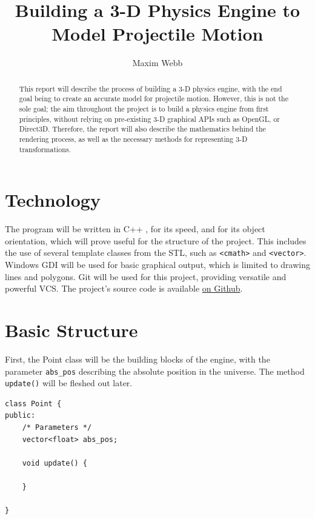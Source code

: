 \documentclass{article}
\title{
	\Huge
	{Building a 3-D Physics Engine to Model Projectile Motion}\\
}
\author{Maxim Webb}
\begin{document}
\maketitle

\newpage

\begin{abstract}
This report will describe the process of building a 3-D physics engine, with the end goal being to create an accurate model for projectile motion.
\newline
\newline
However, this is not the sole goal; the aim throughout the project is to build a physics engine from first principles, without relying on pre-existing 3-D graphical APIs such as OpenGL, or Direct3D. Therefore, the report will also describe the mathematics behind the rendering process, as well as the necessary methods for representing 3-D transformations.
\newline
\end{abstract}
\newpage
\tableofcontents

\newpage

\section{Technology}
The program will be written in C++ \cite{cplusplus}, for its speed, and for its object orientation, which will prove useful for the structure of the project. This includes the use of several template classes from the STL, such as \verb|<cmath>| and \verb|<vector>|.
\newline
\newline
Windows GDI will be used for basic graphical output, which is limited to drawing lines and polygons. 
\newline
\newline
Git will be used for this project, providing versatile and powerful VCS. The project's source code is available 
\href{https://github.com/maximwebb/3D-engine}{\color{blue} on Github}\color{black}.

\newpage
\section{Basic Structure}

First, the Point class will be the building blocks of the engine, with the parameter \verb|abs_pos| describing the absolute position in the universe. The method \verb|update()| will be fleshed out later.
\begin{lstlisting}
class Point {
public:
	/* Parameters */
	vector<float> abs_pos;
	
	void update() {
	
	}

}
\end{lstlisting}
\end{document}
